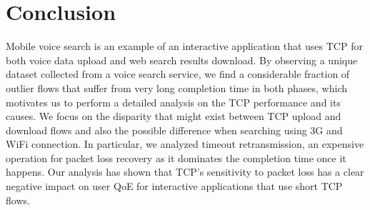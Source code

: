 
\section{Conclusion}
\label{sec:conclude}


Mobile voice search is an example of an interactive application that uses TCP for both voice data upload and web search results download.
By observing a unique dataset collected from a voice search service, we find a considerable fraction of outlier flows that suffer from very long completion time in both phases, which motivates us to perform a detailed analysis on the TCP performance and its causes. We focus on the disparity that might exist between TCP upload and download flows and also the possible difference when searching using 3G and WiFi connection. In particular, we analyzed timeout retransmission, an expensive operation for packet loss recovery as it dominates the completion time once it happens. Our analysis has shown that TCP's sensitivity to packet loss has a clear negative impact on user QoE for interactive applications that use short TCP flows.

